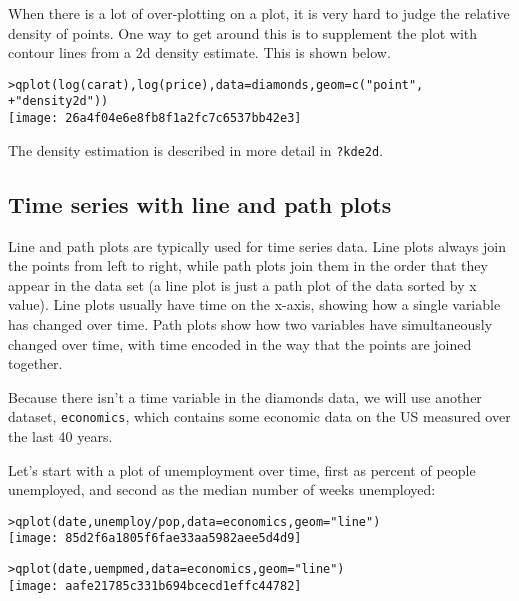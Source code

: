 When there is a lot of over-plotting on a plot, it is very hard to judge the relative density of points.  One way to get around this is to supplement the plot with contour lines from a 2d density estimate.  This is shown below.

\begin{alltt}
> qplot(log(carat), log(price), data = diamonds, geom = c("point", 
+     "density2d"))
\texttt{[image: 26a4f04e6e8fb8f1a2fc7c6537bb42e3]}

\end{alltt}

The density estimation is described in more detail in {\tt ?kde2d}.

\subsection{Time series with line and path plots}\label{sub:line_plot}

Line and path plots are typically used for time series data.  Line plots always join the points from left to right, while path plots join them in the order that they appear in the data set (a line plot is just a path plot of the data sorted by x value).  Line plots usually have time on the x-axis, showing how a single variable has changed over time.  Path plots show how two variables have simultaneously changed over time, with time encoded in the way that the points are joined together.

Because there isn't a time variable in the diamonds data, we will use another dataset, {\tt economics}, which contains some economic data on the US measured over the last 40 years.

Let's start with a plot of unemployment over time, first as percent of people unemployed, and second as the median number of weeks unemployed:

\begin{alltt}
> qplot(date, unemploy/pop, data = economics, geom = "line")
\texttt{[image: 85d2f6a1805f6fae33aa5982aee5d4d9]}

> qplot(date, uempmed, data = economics, geom = "line")
\texttt{[image: aafe21785c331b694bcecd1effc44782]}

\end{alltt}

